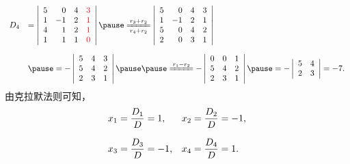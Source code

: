 \begin{frame}
  \begin{footnotesize}
    $$
    \begin{array}{rl}
      D_4 &= \left|
      \begin{array}{rrrr}
        5&0&4&\red{3}\\
        1&-1&2&\red{1}\\
        4&1&2&\red{1}\\
        1&1&1&\red{0}\\
      \end{array}
      \right|
      \pause
      \xlongequal[r_4+r_2]{r_3+r_2}
      \left|
      \begin{array}{rrrrr}
        5&0&4&{3}\\
        1&-1&2&{1}\\
        5&0&4&{2}\\
        2&0&3&{1}\\
      \end{array}
      \right| \\[0.4in]
      &\pause =  -   
      \left|
      \begin{array}{rrr}
        5&4&{3}\\
        5&4&{2}\\
        2&3&{1}\\
      \end{array}
      \right| \pause\pause
      \xlongequal[]{r_1-r_2}
      -\left|
      \begin{array}{rrr}
        0&0&{1}\\
        5&4&{2}\\
        2&3&{1}\\
      \end{array}\right| \pause
      =
      -\left|
      \begin{array}{rrr}
        5&4\\
        2&3\\
      \end{array}\right|
      = -7.
    \end{array}
    $$ \pause
    由克拉默法则可知，
    $$
    \begin{array}{lll}
      \displaystyle x_1 = \frac{D_1}D = 1, &
      \displaystyle x_2 = \frac{D_2}D = -1, \\[0.2in]
      \displaystyle x_3 = \frac{D_3}D = -1, &
      \displaystyle x_4 = \frac{D_4}D = 1.
    \end{array}
    $$
  \end{footnotesize}
\end{frame}



